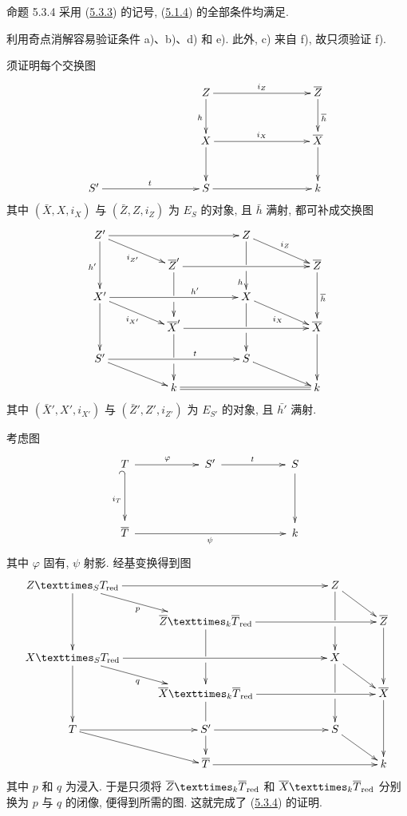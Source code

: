 \begin{enonce*}{命题 5.3.4}
采用 (\hyperref[Vbis.subsubsec5.3.3]{5.3.3}) 的记号,
(\hyperref[Vbis.subsubsec5.1.4]{5.1.4}) 的全部条件均满足.
\end{enonce*}

利用奇点消解容易验证条件 a)、b)、d) 和 e).
此外, c) 来自 f), 故只须验证 f).

须证明每个交换图
\[
\xymatrix@C=3cm@R=1cm{
              &Z         \ar[r]^{i_Z} \ar[d]_{h}& \bar{Z}\ar[d]^{\bar{h}}\\
              &X \ar[r]^{i_X} \ar[d]& \bar{X}\ar[d]\\
 S'\ar[r]^{t} &S  \ar[r]            & k
}
\]
其中 $(\bar{X}, X, i_X)$ 与 $(\bar{Z}, Z, i_Z)$ 为 $E_S$ 的对象,
且 $\bar{h}$ 满射, 都可补成交换图
\[
\xymatrix@C=1.7cm@R=.45cm{
Z' \ar[rr] \ar[rd]_{i_{Z'}} \ar[dd]_{h'}&    & Z \ar[rd]^{i_Z} \ar@{->} '[d][dd]_{h} &\\
         & \bar{Z}' \ar[rr] \ar@{->} '[d][dd]&    & \bar{Z}\ar[dd]^{\bar{h}}\\
X'  \ar[rr]^(.65){h'} \ar[dd]\ar[rd]_{i_{X'}}   &    & X \ar[rd]_{i_X} \ar@{->} '[d][dd]&\\
         & \bar{X}'  \ar@{->} '[d][dd] \ar[rr]&    & \bar{X} \ar[dd]\\
S'\ar[rr]^(.65){t}\ar[rd]        &    & S \ar[rd] &\\
         & k  \ar@{=}[rr]&    & k
}
\]
其中\pageoriginale{} $(\bar{X}', X', i_{X'})$ 与
$(\bar{Z}', Z', i_{Z'})$ 为 $E_{S'}$ 的对象, 且 $\bar{h'}$ 满射.

考虑图
\[
\xymatrix@C=2cm@R=1.5cm@M=.2cm{
T \ar[r]^{\varphi} \ar@{_{(}->}[d]_{i_T}& S'\ar[r]^{t} & S\ar[d]\\
\bar{T} \ar[rr]_{\psi}&  & k\\
}
\]
其中 $\varphi$ 固有, $\psi$ 射影. 经基变换得到图
\[
\xymatrix@C=1cm@R=.6cm{
\fprod{Z}{T_{\red}}{S} \ar[rrr] \ar[rd]_{p} \ar[dd]&&    & Z \ar[rd] \ar@{->} '[d][dd] &\\
         & \fprod{\bar{Z}}{\bar{T}_{\red}}{k} \ar[rrr] \ar@{->} '[d][dd]& &   & \bar{Z}\ar[dd]\\
\fprod{X}{T_{\red}}{S}  \ar[rrr] \ar[dd]\ar[rd]_{q} &  &    & X \ar[rd] \ar@{->} '[d][dd]&\\
         &\fprod{\bar{X}}{\bar{T}_{\red}}{k}  \ar@{->} '[d][dd] \ar[rrr]& &   & \bar{X} \ar[dd]\\
T \ar[rd]\ar[r]& S'\ar[rr]        &    & S \ar[rd] &\\
         & \bar{T}  \ar[rrr]&  &  & k
}
\]
其中\pageoriginale{} $p$ 和 $q$ 为浸入.
于是只须将 $\fprod{\bar{Z}}{\bar{T}_{\red}}{k}$
和 $\fprod{\bar{X}}{\bar{T}_{\red}}{k}$ 分别换为 $p$ 与 $q$ 的闭像,
便得到所需的图. 这就完成了 (\hyperref[Vbis.prop5.3.4]{5.3.4}) 的证明.


